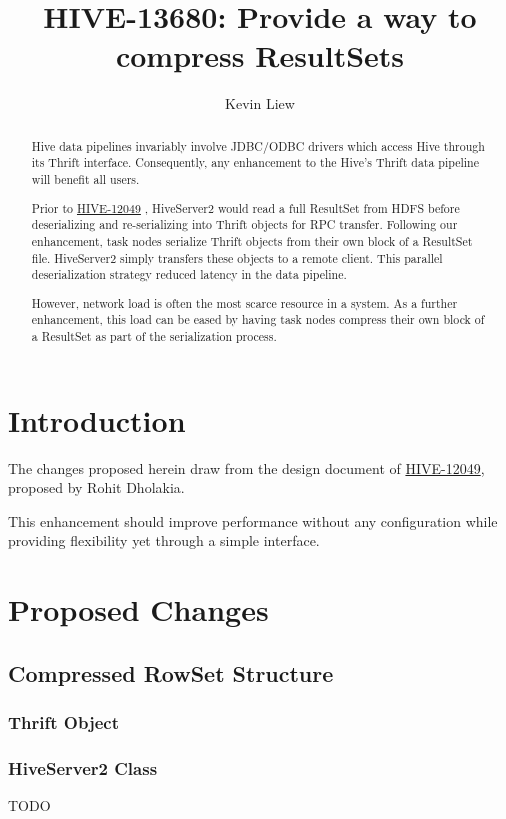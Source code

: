 \documentclass[11pt,a4paper]{article}
\title{HIVE-13680: Provide a way to compress ResultSets}
\author{Kevin Liew}
\begin{document}
\maketitle

\begin{abstract}
	Hive data pipelines invariably involve JDBC/ODBC drivers which access Hive through its Thrift interface. 
	Consequently, any enhancement to the Hive's Thrift data pipeline will benefit all users.
	
	Prior to \href{https://issues.apache.org/jira/browse/HIVE-12049}{HIVE-12049}
	, HiveServer2 would read a full ResultSet from HDFS before deserializing and re-serializing into Thrift objects for RPC transfer.
	Following our enhancement, task nodes serialize Thrift objects from their own block of a ResultSet file. 
	HiveServer2 simply transfers these objects to a remote client. 
	This parallel deserialization strategy reduced latency in the data pipeline.
	
	However, network load is often the most scarce resource in a system. 
	As a further enhancement, this load can be eased by having task nodes compress their own block of a ResultSet as part of the serialization process.
\end{abstract}

\section{Introduction}
	The changes proposed herein draw from the design document of 
	\href{https://issues.apache.org/jira/browse/HIVE-12049}{HIVE-12049}, proposed by Rohit Dholakia.
	
	This enhancement should improve performance without any configuration while providing flexibility yet through a simple interface.

\section{Proposed Changes}

	\subsection{Compressed RowSet Structure}
		\subsubsection{Thrift Object}
		\subsubsection{HiveServer2 Class}
		TODO
\end{document}

